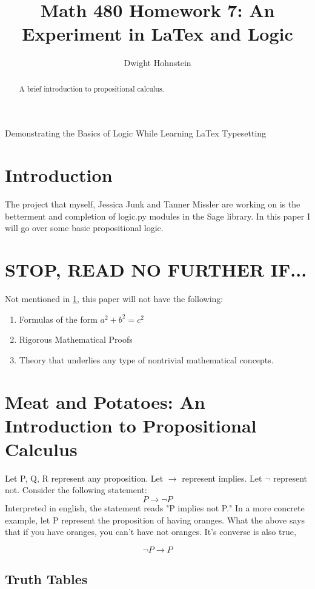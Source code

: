 \documentclass[12pt]{article}
\title{Math 480 Homework 7: An Experiment in LaTex and Logic}
\author{Dwight Hohnstein}
\begin{document}
\maketitle Demonstrating the Basics of Logic While Learning LaTex Typesetting 

\begin{abstract}
A brief introduction to propositional calculus.
\end{abstract}

\section{Introduction}
\label{sec:intro}

The project that myself, Jessica Junk and Tanner Missler are working on is the betterment and completion of logic.py modules in the Sage library. In this paper I will go over some basic propositional logic.

\section{STOP, READ NO FURTHER IF...}
\label{sec:stop}

Not mentioned in \ref{sec:intro}, this paper will not have the following:
\begin{enumerate}
    \item Formulas of the form $a^2+b^2=c^2$

    \item Rigorous Mathematical Proofs

    \item Theory that underlies any type of nontrivial mathematical concepts.
\end{enumerate}


\section{Meat and Potatoes: An Introduction to Propositional  Calculus}
\label{mp}
Let P, Q, R represent any proposition. Let $\to$ represent implies. Let $\lnot$ represent not. Consider the following statement: $$P \to \lnot P$$ Interpreted in english, the statement reads "P implies not P." In a more concrete example, let P represent the proposition of having oranges. What the above says that if you have oranges, you can't have not oranges. It's converse is also true, 

$$
\lnot P \to P
$$


\subsection{Truth Tables}
\end{document}

